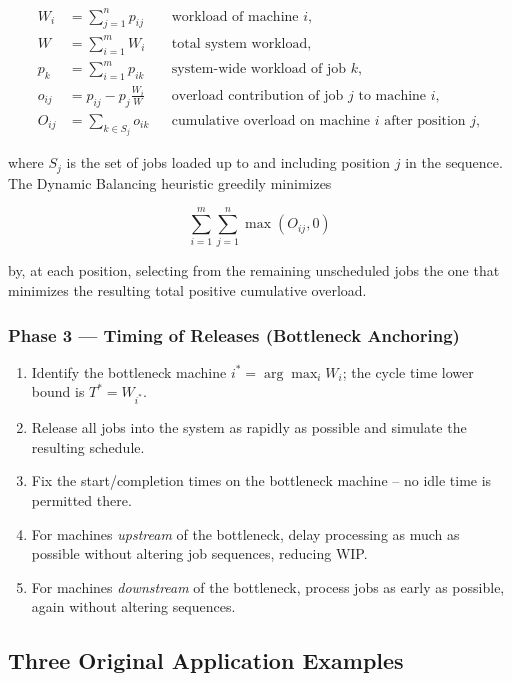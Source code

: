 \documentclass[11pt,a4paper]{article}
\begin{document}
\begin{align*}
  W_i &= \sum_{j=1}^n p_{ij} && \text{workload of machine } i, \\
  W &= \sum_{i=1}^m W_i && \text{total system workload}, \\
  p_k &= \sum_{i=1}^m p_{ik} && \text{system-wide workload of job } k, \\
  o_{ij} &= p_{ij} - p_j \frac{W_i}{W} && \text{overload contribution of job } j \text{ to machine } i, \\
  O_{ij} &= \sum_{k \in S_j} o_{ik} && \text{cumulative overload on machine } i \text{ after position } j,
\end{align*}

where $S_j$ is the set of jobs loaded up to and including position $j$ in
the sequence. The Dynamic Balancing heuristic greedily minimizes

\begin{equation}
  \sum_{i=1}^{m} \sum_{j=1}^{n} \max(O_{ij}, 0)
  \label{eq:overload}
\end{equation}

by, at each position, selecting from the remaining unscheduled jobs the
one that minimizes the resulting total positive cumulative overload.

\subsubsection*{Phase 3 --- Timing of Releases (Bottleneck Anchoring)}

\begin{enumerate}
  \item Identify the bottleneck machine $i^\ast = \arg\max_i W_i$; the
    cycle time lower bound is $T^\ast = W_{i^\ast}$.
  \item Release all jobs into the system as rapidly as possible and
    simulate the resulting schedule.
  \item Fix the start/completion times on the bottleneck machine -- no
    idle time is permitted there.
  \item For machines \emph{upstream} of the bottleneck, delay processing
    as much as possible without altering job sequences, reducing WIP.
  \item For machines \emph{downstream} of the bottleneck, process jobs as
    early as possible, again without altering sequences.
\end{enumerate}

\subsection{Three Original Application Examples}
\end{document}
